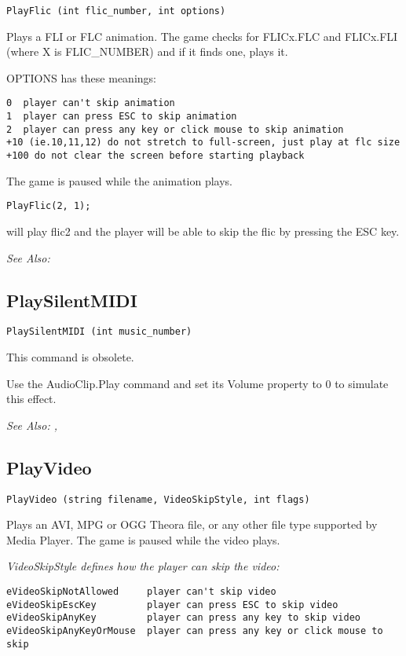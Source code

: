 \begin{verbatim}
PlayFlic (int flic_number, int options)
\end{verbatim}
Plays a FLI or FLC animation. The game checks for FLICx.FLC and FLICx.FLI
(where X is FLIC_NUMBER) and if it finds one, plays it.

OPTIONS has these meanings:
\begin{verbatim}
0  player can't skip animation
1  player can press ESC to skip animation
2  player can press any key or click mouse to skip animation
+10 (ie.10,11,12) do not stretch to full-screen, just play at flc size
+100 do not clear the screen before starting playback
\end{verbatim}
The game is paused while the animation plays.

\begin{verbatim}
PlayFlic(2, 1);
\end{verbatim}
will play flic2 and the player will be able to skip the flic by pressing the ESC key.

\it{See Also:} 


\subsection{PlaySilentMIDI}\label{PlaySilentMIDI}%

\begin{verbatim}
PlaySilentMIDI (int music_number)
\end{verbatim}
This command is obsolete.

Use the AudioClip.Play command and set its Volume property to 0 to simulate this effect.

\it{See Also:} , 


\subsection{PlayVideo}\label{PlayVideo}%

\begin{verbatim}
PlayVideo (string filename, VideoSkipStyle, int flags)
\end{verbatim}
Plays an AVI, MPG or OGG Theora file, or any other file type supported by Media Player.
The game is paused while the video plays.

\it{VideoSkipStyle} defines how the player can skip the video:
\begin{verbatim}
eVideoSkipNotAllowed     player can't skip video
eVideoSkipEscKey         player can press ESC to skip video
eVideoSkipAnyKey         player can press any key to skip video
eVideoSkipAnyKeyOrMouse  player can press any key or click mouse to skip
\end{verbatim}


